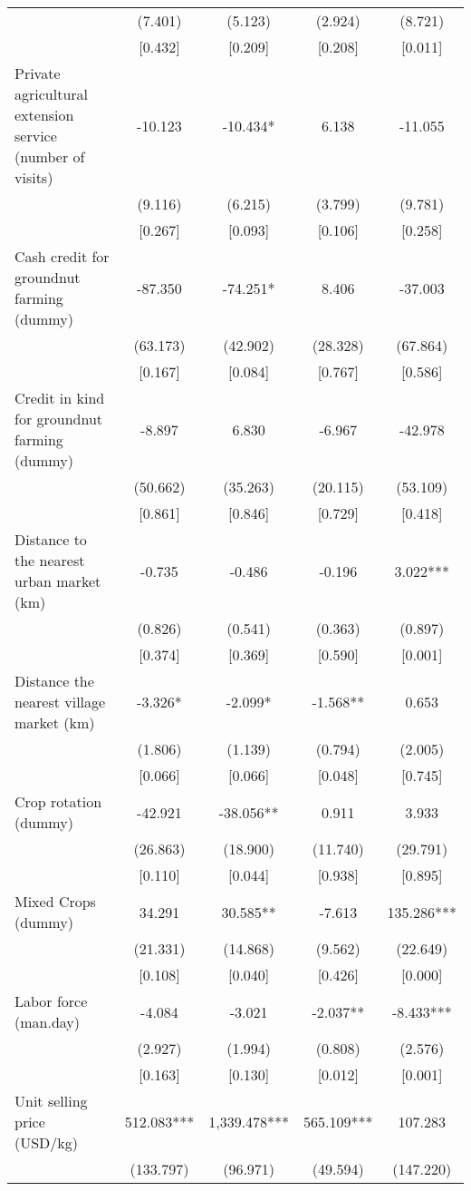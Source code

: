 \documentclass[]{article}
\begin{document}
\begin{tabular}{lcccc}
 & (7.401) & (5.123) & (2.924) & (8.721) \\
 & [0.432] & [0.209] & [0.208] & [0.011] \\
Private agricultural extension service (number of visits) & -10.123 & -10.434* & 6.138 & -11.055 \\
 & (9.116) & (6.215) & (3.799) & (9.781) \\
 & [0.267] & [0.093] & [0.106] & [0.258] \\
Cash credit for groundnut farming (dummy) & -87.350 & -74.251* & 8.406 & -37.003 \\
 & (63.173) & (42.902) & (28.328) & (67.864) \\
 & [0.167] & [0.084] & [0.767] & [0.586] \\
Credit in kind for groundnut farming (dummy) & -8.897 & 6.830 & -6.967 & -42.978 \\
 & (50.662) & (35.263) & (20.115) & (53.109) \\
 & [0.861] & [0.846] & [0.729] & [0.418] \\
Distance to the nearest urban market (km) & -0.735 & -0.486 & -0.196 & 3.022*** \\
 & (0.826) & (0.541) & (0.363) & (0.897) \\
 & [0.374] & [0.369] & [0.590] & [0.001] \\
Distance the nearest village market (km) & -3.326* & -2.099* & -1.568** & 0.653 \\
 & (1.806) & (1.139) & (0.794) & (2.005) \\
 & [0.066] & [0.066] & [0.048] & [0.745] \\
Crop rotation (dummy) & -42.921 & -38.056** & 0.911 & 3.933 \\
 & (26.863) & (18.900) & (11.740) & (29.791) \\
 & [0.110] & [0.044] & [0.938] & [0.895] \\
Mixed Crops (dummy) & 34.291 & 30.585** & -7.613 & 135.286*** \\
 & (21.331) & (14.868) & (9.562) & (22.649) \\
 & [0.108] & [0.040] & [0.426] & [0.000] \\
Labor force (man.day) & -4.084 & -3.021 & -2.037** & -8.433*** \\
 & (2.927) & (1.994) & (0.808) & (2.576) \\
 & [0.163] & [0.130] & [0.012] & [0.001] \\
Unit selling price (USD/kg) & 512.083*** & 1,339.478*** & 565.109*** & 107.283 \\
 & (133.797) & (96.971) & (49.594) & (147.220) \\

\end{tabular}
\end{document}
